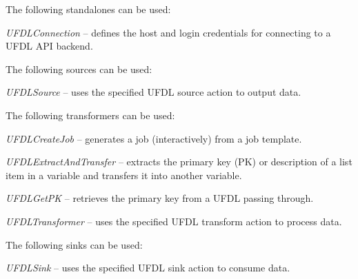 \documentclass[a4paper]{book}
\begin{document}
\noindent The following standalones can be used:
\begin{tight_itemize}
  \item \textit{UFDLConnection} -- defines the host and login credentials for
  connecting to a UFDL API backend.
\end{tight_itemize}
The following sources can be used:
\begin{tight_itemize}
  \item \textit{UFDLSource} -- uses the specified UFDL source action to output data.
\end{tight_itemize}
The following transformers can be used:
\begin{tight_itemize}
  \item \textit{UFDLCreateJob} -- generates a job (interactively) from a job template.
  \item \textit{UFDLExtractAndTransfer} -- extracts the primary key (PK) or description of a list item
  in a variable and transfers it into another variable.
  \item \textit{UFDLGetPK} -- retrieves the primary key from a UFDL passing through.
  \item \textit{UFDLTransformer} -- uses the specified UFDL transform action to process data.
\end{tight_itemize}
The following sinks can be used:
\begin{tight_itemize}
  \item \textit{UFDLSink} -- uses the specified UFDL sink action to consume data.
\end{tight_itemize}
\end{document}
